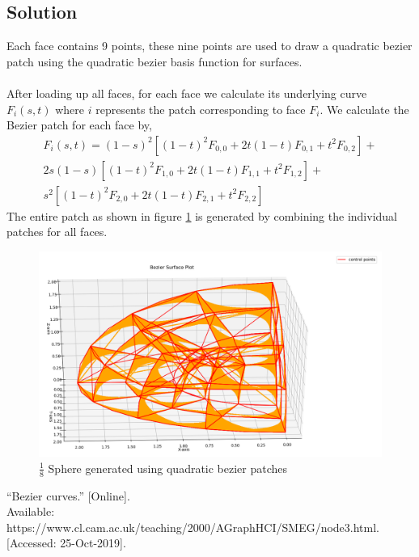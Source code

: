 \documentclass[a4paper, 11pt]{article}
\begin{document}
\begin{enumerate}
\subsection*{Solution}
Each face contains 9 points, these nine points are used to draw a quadratic bezier patch using the quadratic bezier basis function for surfaces. \\ \\
After loading up all faces, for each face we calculate its underlying curve \(F_i(s,t)\) where \(i\) represents the patch corresponding to face \(F_i\). We calculate the Bezier patch for each face by, 
\begin{multline}
    \label{eq:sphere}
        F_i(s,t) = (1-s)^2[(1-t)^2 F_{0,0} + 2t(1-t) F_{0,1} + t^2 F_{0,2}] + \\ 2s(1-s)[(1-t)^2 F_{1,0} + 2t(1-t) F_{1,1} + t^2 F_{1,2}] + \\
        s^2[(1-t)^2 F_{2,0} + 2t(1-t) F_{2,1} + t^2 F_{2,2}]
\end{multline}
The entire patch as shown in figure \ref{fig:BezierSurfaceQ3} is generated by combining the individual patches for all faces. 
\begin{figure}[ht]
\includegraphics[scale=0.5]{resources/Q3_QBezSurface.png}  
\centering
\caption{$\frac{1}{8}$ Sphere generated using quadratic bezier patches}
\label{fig:BezierSurfaceQ3}
\end{figure}
\newpage
\begin{thebibliography}{}
     “Bezier curves.” [Online]. \\Available: https://www.cl.cam.ac.uk/teaching/2000/AGraphHCI/SMEG/node3.html. [Accessed: 25-Oct-2019].
\end{thebibliography}


\end{enumerate}
\end{document}
